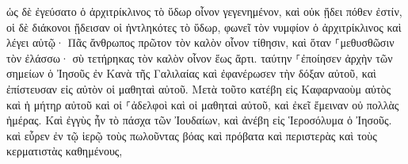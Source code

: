 \documentclass{openreader}
\begin{document}
ὡς δὲ ἐγεύσατο ὁ ἀρχιτρίκλινος τὸ ὕδωρ οἶνον γεγενημένον, καὶ οὐκ ᾔδει πόθεν ἐστίν, οἱ δὲ διάκονοι ᾔδεισαν οἱ ἠντληκότες τὸ ὕδωρ, φωνεῖ τὸν νυμφίον ὁ ἀρχιτρίκλινος 
καὶ λέγει αὐτῷ· Πᾶς ἄνθρωπος πρῶτον τὸν καλὸν οἶνον τίθησιν, καὶ ὅταν ⸀μεθυσθῶσιν τὸν ἐλάσσω· σὺ τετήρηκας τὸν καλὸν οἶνον ἕως ἄρτι. 
ταύτην ⸀ἐποίησεν ἀρχὴν τῶν σημείων ὁ Ἰησοῦς ἐν Κανὰ τῆς Γαλιλαίας καὶ ἐφανέρωσεν τὴν δόξαν αὐτοῦ, καὶ ἐπίστευσαν εἰς αὐτὸν οἱ μαθηταὶ αὐτοῦ. 
Μετὰ τοῦτο κατέβη εἰς Καφαρναοὺμ αὐτὸς καὶ ἡ μήτηρ αὐτοῦ καὶ οἱ ⸀ἀδελφοὶ καὶ οἱ μαθηταὶ αὐτοῦ, καὶ ἐκεῖ ἔμειναν οὐ πολλὰς ἡμέρας. 
Καὶ ἐγγὺς ἦν τὸ πάσχα τῶν Ἰουδαίων, καὶ ἀνέβη εἰς Ἱεροσόλυμα ὁ Ἰησοῦς. 
καὶ εὗρεν ἐν τῷ ἱερῷ τοὺς πωλοῦντας βόας καὶ πρόβατα καὶ περιστερὰς καὶ τοὺς κερματιστὰς καθημένους, 
\end{document}
